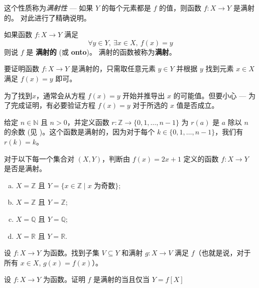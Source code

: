 这个性质称为\textit{满射性} --- 如果 $Y$ 的每个元素都是 $f$ 的值，则函数 $f : X \to Y$ 是满射的。 对此进行了精确说明。

\begin{definition}
\label{defSurjective}\label{defSurjection}
如果函数 $f : X \to Y$ 满足
\[ \forall y \in Y,\ \exists x \in X,\ f(x) = y \]
则说 $f$ 是 \textbf{满射的} (或 \textbf{onto})。
满射的函数被称为\textbf{满射}。
\end{definition}

\begin{strategy}
要证明函数 $f : X \to Y$ 是满射的，只需取任意元素 $y \in Y$ 并根据 $y$ 找到元素 $x \in X$ 满足 $f(x)=y$ 即可。

为了找到$x$，通常会从方程 $f(x)=y$ 开始并推导出 $x$ 的可能值。但要小心 --- 为了完成证明，有必要验证方程 $f(x)=y$ 对于所选的 $x$ 值是否成立。
\end{strategy}

\begin{example}
给定 $n \in \mathbb{N}$ 且 $n > 0$，并定义函数 $r : \mathbb{Z} \to \{ 0, 1, \dots, n-1 \}$ 为 $r(a)$ 是 $a$ 除以 $n$ 的余数 (见 )。这个函数是满射的，因为对于每个 $k \in \{ 0, 1, \dots, n-1 \}$，我们有 $r(k)=k$。
\end{example}

\begin{exercise}
对于以下每一个集合对 $(X,Y)$，判断由 $f(x)=2x+1$ 定义的函数 $f : X \to Y$ 是否是满射。
\begin{enumerate}[(a)]
\item $X = \mathbb{Z}$ 且 $Y = \{ x \in \mathbb{Z} \mid x \text{ 为奇数} \}$;
\item $X = \mathbb{Z}$ 且 $Y = \mathbb{Z}$;
\item $X = \mathbb{Q}$ 且 $Y = \mathbb{Q}$;
\item $X = \mathbb{R}$ 且 $Y = \mathbb{R}$.
\end{enumerate}
\end{exercise}

\begin{exercise}
设 $f : X \to Y$ 为函数。找到子集 $V \subseteq Y$ 和满射 $g : X \to V$ 满足 $f$（也就是说，对于所有 $x \in X$, $g(x)=f(x)$）。
\end{exercise}

\begin{exercise}
设 $f : X \to Y$ 为函数。证明 $f$ 是满射的当且仅当 $Y=f[X]$
\end{exercise}


